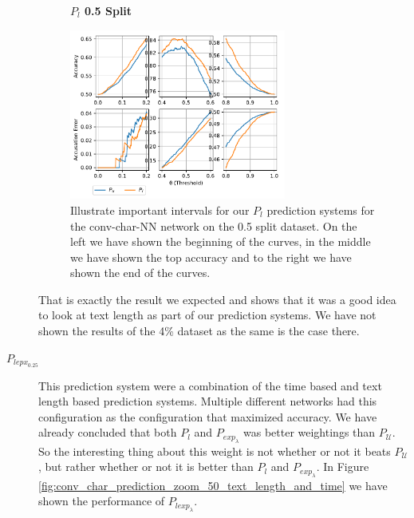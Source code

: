 \begin{description}
        \begin{figure}
            \centering
            \textbf{$P_l$ 0.5 Split}\par\medskip
            \includegraphics[width=0.7\textwidth]{./pictures/discussion/conv_char_nn_prediction_zoom_50_text_length}
            \caption{Illustrate important intervals for our $P_l$ prediction
                systems for the \gls{conv-char-NN} network on the 0.5 split
                dataset. On the left we have shown the beginning of the curves,
                in the middle we have shown the top accuracy and to the right we
                have shown the end of the curves.}
            \label{fig:conv_char_prediction_zoom_50_text_length}
        \end{figure}

        That is exactly the result we expected and shows that it was a good idea
        to look at text length as part of our prediction systems. We have not
        shown the results of the 4\% dataset as the same is the case there.

    \item[$P_{lepx_{0.25}}$]

        This prediction system were a combination of the time based and text
        length based prediction systems. Multiple different networks had this
        configuration as the configuration that maximized accuracy. We have
        already concluded that both $P_l$ and $P_{exp_\lambda}$ was better
        weightings than $P_\mathcal{U}$. So the interesting thing about this
        weight is not whether or not it beats $P_\mathcal{U}$, but rather
        whether or not it is better than $P_l$ and $P_{exp_\lambda}$. In Figure
        \ref{fig:conv_char_prediction_zoom_50_text_length_and_time} we have
        shown the performance of $P_{lexp_\lambda}$.


\end{description}
